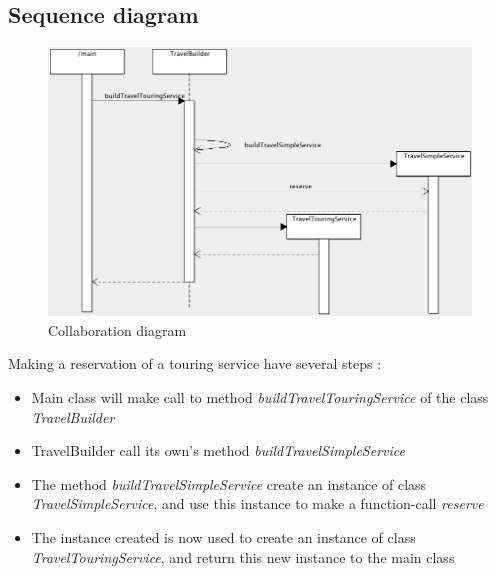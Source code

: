\subsection{Sequence diagram}

\begin{figure}[h]
\centering
\includegraphics[width=12cm]{project/images/sequence.png}
\caption{Collaboration diagram}
\end{figure}

Making a reservation of a touring service have several steps :
\begin{itemize}
\item Main class will make call to method \textit{buildTravelTouringService} of the class \textit{TravelBuilder}
\item TravelBuilder call its own's method \textit{buildTravelSimpleService} 
\item The method \textit{buildTravelSimpleService} create an instance of class \textit{TravelSimpleService}, and use this instance to make a function-call \textit{reserve}
\item The instance created is now used to create an instance of class \textit{TravelTouringService}, and return this new instance to the main class
\end{itemize}